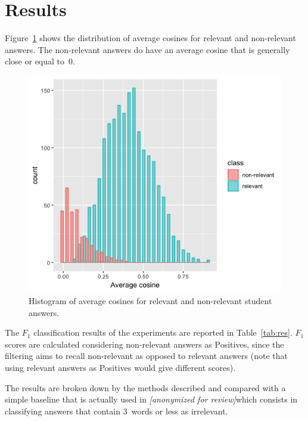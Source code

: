 \documentclass{edm_template}
\newcommand{\dalite}{\textit{[anonymized for review]}}
\begin{document}
\section{Results}

Figure~\ref{tab:hist1} shows the distribution of average cosines for relevant and non-relevant answers.  The non-relevant answers do have an average cosine that is generally close or equal to~0.  

\begin{figure}
  \includegraphics[width=\columnwidth]{Images/dalite_av_cosine_10clusters.png}
  \caption{Histogram of average cosines for relevant and non-relevant student answers.}
  \label{tab:hist1}
\end{figure}

The $F_1$ classification results of the experiments are reported in Table~\ref{tab:res}.  $F_1$ scores are calculated considering non-relevant answers as Positives, since the filtering aims to recall non-relevant as opposed to relevant answers (note that using relevant answers as Positives would give different scores).

The results are broken down by the methods described and compared with a simple baseline that is actually used in \dalite which consists in classifying answers that contain 3~words or less as irrelevant.
\end{document}
